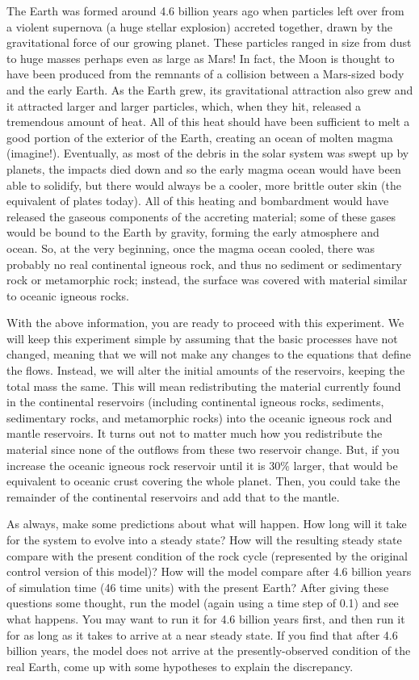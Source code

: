 \documentclass[11pt,letterpaper]{article}
\begin{document}
The Earth was formed around 4.6 billion years ago when particles left over from a violent supernova (a huge stellar explosion) accreted together, drawn by the gravitational force of our growing planet. These particles ranged in size from dust to huge masses perhaps even as large as Mars! In fact, the Moon is thought to have been produced from the remnants of a collision between a Mars-sized body and the early Earth. As the Earth grew, its gravitational attraction also grew and it attracted larger and larger particles, which, when they hit, released a tremendous amount of heat. All of this heat should have been sufficient to melt a good portion of the exterior of the Earth, creating an ocean of molten magma (imagine!). Eventually, as most of the debris in the solar system was swept up by planets, the impacts died down and so the early magma ocean would have been able to solidify, but there would always be a cooler, more brittle outer skin (the equivalent of plates today). All of this heating and bombardment would have released the gaseous components of the accreting material; some of these gases would be bound to the Earth by gravity, forming the early atmosphere and ocean. So, at the very beginning, once the magma ocean cooled, there was probably no real continental igneous rock, and thus no sediment or sedimentary rock or metamorphic rock; instead, the surface was covered with material similar to oceanic igneous rocks. 

With the above information, you are ready to proceed with this experiment. We will keep this experiment simple by assuming that the basic processes have not changed, meaning that we will not make any changes to the equations that define the flows. Instead, we will alter the initial amounts of the reservoirs, keeping the total mass the same. This will mean redistributing the material currently found in the continental reservoirs (including continental igneous rocks, sediments, sedimentary rocks, and metamorphic rocks) into the oceanic igneous rock and mantle reservoirs. It turns out not to matter much how you redistribute the material since none of the outflows from these two reservoir change. But, if you increase the oceanic igneous rock reservoir until it is 30\% larger, that would be equivalent to oceanic crust covering the whole planet. Then, you could take the remainder of the continental reservoirs and add that to the mantle. 

As always, make some predictions about what will happen. How long will it take for the system to evolve into a steady state? How will the resulting steady state compare with the present condition of the rock cycle (represented by the original control version of this model)? How will the model compare after 4.6 billion years of simulation time (46 time units) with the present Earth? After giving these questions some thought, run the model (again using a time step of 0.1) and see what happens. You may want to run it for 4.6 billion years first, and then run it for as long as it takes to arrive at a near steady state. If you find that after 4.6 billion years, the model does not arrive at the presently-observed condition of the real Earth, come up with some hypotheses to explain the discrepancy.
\end{document}

